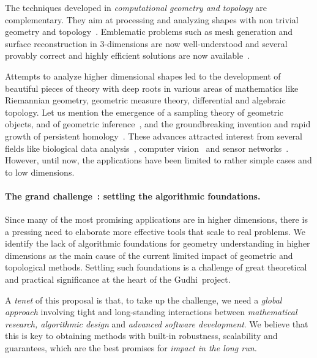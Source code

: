 The techniques developed in {\em computational geometry and topology}  are complementary. They aim at processing and analyzing shapes with non trivial geometry and topology~\cite{hh-ct-2010}. 
Emblematic problems such as mesh generation and surface reconstruction in 3-dimensions are now well-understood and several provably correct and highly efficient solutions are now available~\cite{geometrica-ecg-book}. 

Attempts to analyze higher dimensional shapes led to the development of beautiful pieces of theory with deep roots in various areas of mathematics like Riemannian geometry, geometric measure theory, differential and algebraic topology. Let us mention  the emergence of a sampling theory of geometric objects, and of geometric inference~\cite{geometrica-ccl09}, and the groundbreaking invention and rapid growth of persistent homology~\cite{eh-ph-2008}.
These advances 
attracted  interest from several fields like biological data analysis~\cite{fpgo-airc-2009}, computer vision~\cite{cids-lbsni-2008} and sensor networks~\cite{rg-bptd-2008}. However, 
until now, the applications have been limited  to rather simple cases and to low dimensions.

\vspace{-1mm}

\paragraph{The grand challenge~: settling the algorithmic foundations.}
Since many of the most promising applications are in higher dimensions, there is a pressing need to elaborate more effective tools that scale to real problems.  We identify the lack of  algorithmic foundations for geometry understanding in higher dimensions as 
the main cause of the current limited impact of geometric and topological methods.  Settling such foundations
is a challenge of great theoretical and practical significance at the heart of the Gudhi~project.


A {\em tenet} of this proposal is that, to take up the challenge, we need a {\em global approach} involving tight and long-standing interactions between {\em mathematical research, algorithmic design} and {\em advanced software development}. We believe that this is key to obtaining methods with built-in robustness, scalability and guarantees, which are the best promises for {\em impact in the long run.}


